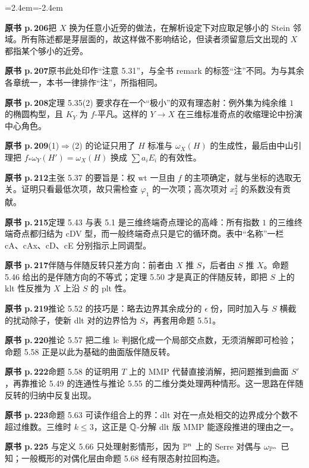 \begin{list}{}{\leftmargin=2.4em\itemindent=-2.4em\itemsep=2pt\parsep=0pt}
\item \textbf{原书 p.\,206}\quad 把 $X$ 换为任意小近旁的做法，在解析设定下对应取足够小的 Stein 邻域。所有陈述都是芽层面的，故这样做不影响结论，但读者须留意后文出现的 $X$ 都指某个够小的近旁。
\item \textbf{原书 p.\,207}\quad 原书此处印作“注意 5.31”，与全书 remark 的标签“注”不同。为与其余各章统一，本书一律排作“注”，所指相同。
\item \textbf{原书 p.\,208}\quad 定理 5.35(2) 要求存在一个“极小”的双有理态射：例外集为纯余维 $1$ 的椭圆构型，且 $K_Y$ 为 $f$-平凡。这样的 $Y\to X$ 在三维标准奇点的收缩理论中扮演中心角色。
\item \textbf{原书 p.\,209}(1)$\Rightarrow$(2) 的论证只用了 $H$ 标准与 $\omega_X(H)$ 的生成性，最后由中山引理把 $f_*\omega_Y(H')=\omega_X(H)$ 换成 $\sum a_iE_i$ 的有效性。
\item \textbf{原书 p.\,212}\quad 主张 5.37 的要旨是：权 $\mathrm{wt}$ 一旦由 $f$ 的主项确定，就与坐标的选取无关。证明只看最低次项，故只需检查 $\varphi_1$ 的一次项；高次项对 $x_2^2$ 的系数没有贡献。
\item \textbf{原书 p.\,215}\quad 定理 5.43 与表 5.1 是三维终端奇点理论的高峰：所有指数 $1$ 的三维终端奇点都归结为 cDV 型，而一般终端奇点只是它的循环商。表中“名称”一栏 cA、cAx、cD、cE 分别指示上同调型。
\item \textbf{原书 p.\,217}\quad 伴随与伴随反转只差方向：前者由 $X$ 推 $S$，后者由 $S$ 推 $X$。命题 5.46 给出的是伴随方向的不等式；定理 5.50 才是真正的伴随反转，即把 $S$ 上的 klt 性反推为 $X$ 上沿 $S$ 的 plt 性。
\item \textbf{原书 p.\,219}\quad 推论 5.52 的技巧是：略去边界其余成分的 $\epsilon$ 份，同时加入与 $S$ 横截的扰动除子，使新 dlt 对的边界恰为 $S$，再套用命题 5.51。
\item \textbf{原书 p.\,220}\quad 推论 5.57 把二维 lc 判据化成一个局部交点数，无须消解即可检验；命题 5.58 正是以此为基础的曲面版伴随反转。
\item \textbf{原书 p.\,222}\quad 命题 5.58 的证明用 $T$ 上的 MMP 代替直接消解，把问题推到曲面 $S'$，再靠推论 5.49 的连通性与推论 5.55 的二维分类处理两种情形。这一思路在伴随反转的归纳中反复出现。
\item \textbf{原书 p.\,223}\quad 命题 5.63 可读作组合上的界：dlt 对在一点处相交的边界成分个数不超过维数。三维时 $k\le3$，这正是 $\mathbb{Q}$-分解 dlt 版 MMP 能逐段推进的理由之一。
\item \textbf{原书 p.\,225} 与定义 5.66 只处理射影情形，因为 $\mathbb{P}^n$ 上的 Serre 对偶与 $\omega_{\mathbb{P}^n}$ 已知；一般概形的对偶化层由命题 5.68 经有限态射拉回构造。

\end{list}
